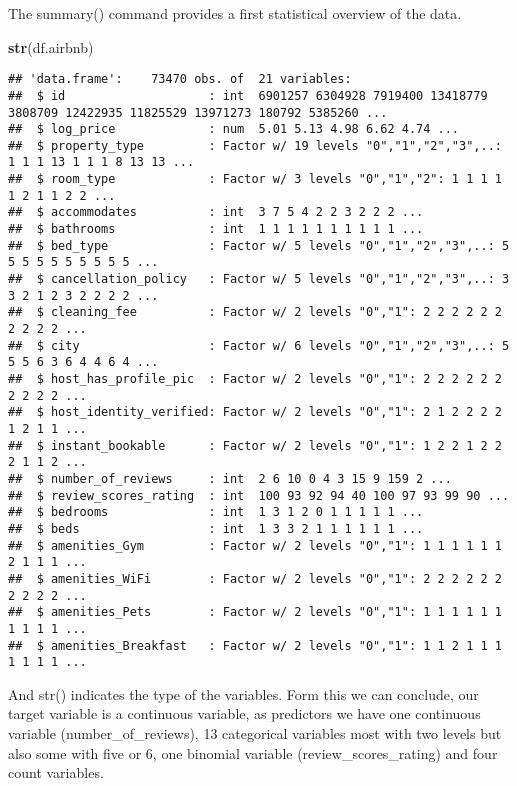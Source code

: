\documentclass[
]{article}
\newenvironment{Shaded}{\begin{snugshade}}{\end{snugshade}}
\newcommand{\KeywordTok}[1]{\textcolor[rgb]{0.13,0.29,0.53}{\textbf{#1}}}
\newcommand{\NormalTok}[1]{#1}
\begin{document}
The summary() command provides a first statistical overview of the data.

\begin{Shaded}
\begin{Highlighting}[]
\KeywordTok{str}\NormalTok{(df.airbnb)}
\end{Highlighting}
\end{Shaded}

\begin{verbatim}
## 'data.frame':    73470 obs. of  21 variables:
##  $ id                    : int  6901257 6304928 7919400 13418779 3808709 12422935 11825529 13971273 180792 5385260 ...
##  $ log_price             : num  5.01 5.13 4.98 6.62 4.74 ...
##  $ property_type         : Factor w/ 19 levels "0","1","2","3",..: 1 1 1 13 1 1 1 8 13 13 ...
##  $ room_type             : Factor w/ 3 levels "0","1","2": 1 1 1 1 1 2 1 1 2 2 ...
##  $ accommodates          : int  3 7 5 4 2 2 3 2 2 2 ...
##  $ bathrooms             : int  1 1 1 1 1 1 1 1 1 1 ...
##  $ bed_type              : Factor w/ 5 levels "0","1","2","3",..: 5 5 5 5 5 5 5 5 5 5 ...
##  $ cancellation_policy   : Factor w/ 5 levels "0","1","2","3",..: 3 3 2 1 2 3 2 2 2 2 ...
##  $ cleaning_fee          : Factor w/ 2 levels "0","1": 2 2 2 2 2 2 2 2 2 2 ...
##  $ city                  : Factor w/ 6 levels "0","1","2","3",..: 5 5 5 6 3 6 4 4 6 4 ...
##  $ host_has_profile_pic  : Factor w/ 2 levels "0","1": 2 2 2 2 2 2 2 2 2 2 ...
##  $ host_identity_verified: Factor w/ 2 levels "0","1": 2 1 2 2 2 2 1 2 1 1 ...
##  $ instant_bookable      : Factor w/ 2 levels "0","1": 1 2 2 1 2 2 2 1 1 2 ...
##  $ number_of_reviews     : int  2 6 10 0 4 3 15 9 159 2 ...
##  $ review_scores_rating  : int  100 93 92 94 40 100 97 93 99 90 ...
##  $ bedrooms              : int  1 3 1 2 0 1 1 1 1 1 ...
##  $ beds                  : int  1 3 3 2 1 1 1 1 1 1 ...
##  $ amenities_Gym         : Factor w/ 2 levels "0","1": 1 1 1 1 1 1 2 1 1 1 ...
##  $ amenities_WiFi        : Factor w/ 2 levels "0","1": 2 2 2 2 2 2 2 2 2 2 ...
##  $ amenities_Pets        : Factor w/ 2 levels "0","1": 1 1 1 1 1 1 1 1 1 1 ...
##  $ amenities_Breakfast   : Factor w/ 2 levels "0","1": 1 1 2 1 1 1 1 1 1 1 ...
\end{verbatim}

And str() indicates the type of the variables. Form this we can
conclude, our target variable is a continuous variable, as predictors we
have one continuous variable (number\_of\_reviews), 13 categorical
variables most with two levels but also some with five or 6, one
binomial variable (review\_scores\_rating) and four count variables.
\end{document}
